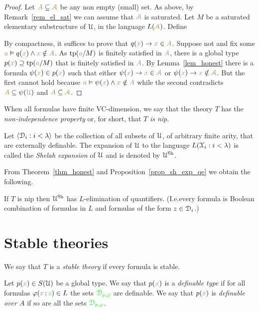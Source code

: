 \documentclass[creche.tex]{subfiles}
\begin{document}
\begin{proof}
Let ${\color{brown} A}\subseteq{\color{brown}{\EuScript A}}$ be any non empty (small) set. As above, by  Remark~\ref{rem_el_sat} we can assume that ${\color{brown}{\EuScript A}}$ is saturated. Let $M$ be a saturated elementary substructure of $\EuScript U$, in the language $L({\color{brown}{\EuScript A}})$. Define


By compactness, it suffices to prove that $q({\color{brown} x})\rightarrow {\color{brown}x}\in{\color{brown}A}$. Suppose not and fix some ${\color{brown} a}\vDash q({\color{brown} x})\wedge {\color{brown}x}\notin{\color{brown}A}$. As ${\rm tp}({\color{brown} a}/M)$ is finitely satisfied in ${\color{brown} A}$, there is a global type $p({\color{brown} x})\supseteq {\rm tp}({\color{brown} a}/M)$ that is finitely satisfied in ${\color{brown} A}$. By Lemma~\ref{lem_honest} there is a formula $\psi({\color{brown} x})\in p({\color{brown} x})$ such that either $\psi({\color{brown} x})\rightarrow {\color{brown}x}\in{\color{brown}{\EuScript A}}$ or $\psi({\color{brown} x})\rightarrow {\color{brown}x}\notin{\color{brown}{\EuScript A}}$. But the first cannot hold because ${\color{brown} a}\vDash \psi({\color{brown} x})\wedge {\color{brown}x}\notin{\color{brown}A}$ while the second contradicts ${\color{brown} A}\subseteq\psi({\color{brown}\EuScript U})$ and ${\color{brown} A}\subseteq{\color{brown}{\EuScript A}}$.
\end{proof}

When all formulas have finite VC-dimension, we say that the theory $T$ has the \emph{non-independence property\/} or, for short, that $T$ \emph{is nip}.

Let $\langle\EuScript D_i:i<\lambda\rangle$ be the collection of all subsets of $\EuScript U$, of arbitrary finite arity, that are externally definable. The expansion of $\EuScript U$ to the language $L(\EuScript X_i:i<\lambda)$ is called the \emph{Shelah expansion\/} of $\EuScript U$ and is denoted by \emph{$\EuScript U^{\rm Sh}$}. 

From Theorem~\ref{thm_honest} and Proposition~\ref{prop_sh_exp_qe} we obtain the following.

\begin{corollary}\label{corol_sh_exp_qe}
If $T$ is nip then $\EuScript U^{\rm Sh}$ has $L$-elimination of quantifiers. (I.e.\@ every formula is Boolean combination of formulas in $L$ and formulas of the form $z\in\EuScript D_i$.)\QED
\end{corollary}


\section{Stable theories}
\label{stable_teories}

We say that $T$ is a \emph{stable theory\/} if every formula is stable.

Let $p({\color{brown} x})\in S(\EuScript U)$ be a global type. We say that $p({\color{brown} x})$ is a \emph{definable type\/} if  for all formulas $\varphi({\color{brown} x}\,;{\color{green} z})\in L$ the sets ${\color{green}\EuScript D_{p,\varphi}}$ are definable. We say that $p({\color{brown} x})$ is  \emph{definable over $A$} if so are all the sets ${\color{green}\EuScript D_{p,\varphi}}$. 
\end{document}
